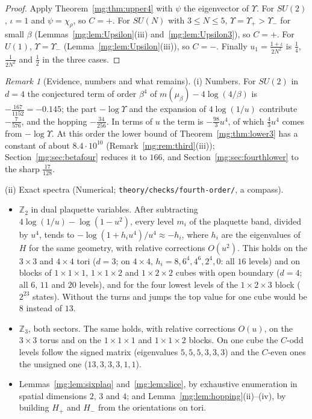 \documentclass[11pt,a4paper]{article}
\theoremstyle{definition}
\theoremstyle{remark}
\newtheorem{remark}[theorem]{Remark}
\begin{document}
\begin{proof}
Apply Theorem~\ref{mg:thm:upper4} with $\psi$ the eigenvector of $\Upsilon$. For $SU(2)$, $\iota=1$ and $\psi=\chi_\rho$, so $C=+$. For $SU(N)$ with $3\le N\le5$,
$\Upsilon=\Upsilon_+>\Upsilon_-$ for small $\beta$ (Lemmas~\ref{mg:lem:Upsilon}(iii) and~\ref{mg:lem:Upsilon3}), so $C=+$. For $U(1)$, $\Upsilon=\Upsilon_-$
(Lemma~\ref{mg:lem:Upsilon}(iii)), so $C=-$. Finally $u_1=\frac{1+\iota}{2N^2}$ is $\frac14$, $\frac1{2N^2}$ and $\frac12$ in the three cases.
\end{proof}

\begin{remark}[Evidence, numbers and what remains]\label{mg:rem:fourth}
(i) Numbers. For $SU(2)$ in $d=4$ the conjectured term of order $\beta^4$ of $m(\mu_\beta)-4\log(4/\beta)$ is $-\frac{167}{1152}=-0.145$; the part $-\log\Upsilon$ and
the expansion of $4\log(1/u)$ contribute $-\frac7{576}$, and the hopping $-\frac{34}{256}$. In terms of $u$ the term is $-\frac{98}3u^4$, of which $\frac43u^4$
comes from $-\log\Upsilon$. At this order the lower bound of Theorem~\ref{mg:thm:lower3} has a constant of about $8.4\cdot10^{10}$ (Remark~\ref{mg:rem:third}(iii)); Section~\ref{mg:sec:betafour}
reduces it to $166$, and Section~\ref{mg:sec:fourthlower} to the sharp $\frac{17}{128}$.

(ii) Exact spectra (Numerical; \texttt{theory/checks/fourth-order/}, a compass).
\begin{itemize}
\item $\mathbb Z_2$ in dual plaquette variables. After subtracting $4\log(1/u)-\log(1-u^2)$, every level $m_i$ of the plaquette band, divided by $u^4$, tends to
$-\log(1+h_iu^4)/u^4\approx-h_i$, where $h_i$ are the eigenvalues of $H$ for the same geometry, with relative corrections $O(u^2)$. This holds on the $3\times3$
and $4\times4$ tori ($d=3$; on $4\times4$, $h_i=8,6^4,4^6,2^4,0$: all $16$ levels) and on blocks of $1\times1\times1$, $1\times1\times2$ and $1\times2\times2$ cubes
with open boundary ($d=4$; all $6$, $11$ and $20$ levels), and for the four lowest levels of the $1\times2\times3$ block ($2^{23}$ states). Without the turns
and jumps the top value for one cube would be $8$ instead of $13$.
\item $\mathbb Z_3$, both sectors. The same holds, with relative corrections $O(u)$, on the $3\times3$ torus and on the $1\times1\times1$ and $1\times1\times2$ blocks. On one cube the $C$-odd levels
follow the signed matrix (eigenvalues $5,5,5,3,3,3$) and the $C$-even ones the unsigned one ($13,3,3,3,1,1$).
\item Lemmas~\ref{mg:lem:sixplaq} and~\ref{mg:lem:slice}, by exhaustive enumeration in spatial dimensions $2$, $3$ and $4$; and
Lemma~\ref{mg:lem:hopping}(ii)--(iv), by building $H_+$ and $H_-$ from the orientations on tori.
\end{itemize}


\end{remark}
\end{document}

